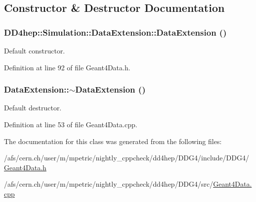 \subsection{Constructor \& Destructor Documentation}
\hypertarget{class_d_d4hep_1_1_simulation_1_1_data_extension_a404504756d040999b53938a61bcb2f53}{
\subsubsection[{DataExtension}]{\setlength{\rightskip}{0pt plus 5cm}DD4hep::Simulation::DataExtension::DataExtension ()}}
\label{class_d_d4hep_1_1_simulation_1_1_data_extension_a404504756d040999b53938a61bcb2f53}


Default constructor. 

Definition at line 92 of file Geant4Data.h.\hypertarget{class_d_d4hep_1_1_simulation_1_1_data_extension_a088b1be47c96c8b6ab44527bfa1f60bc}{
\subsubsection[{$\sim$DataExtension}]{\setlength{\rightskip}{0pt plus 5cm}DataExtension::$\sim$DataExtension ()}}
\label{class_d_d4hep_1_1_simulation_1_1_data_extension_a088b1be47c96c8b6ab44527bfa1f60bc}


Default destructor. 

Definition at line 53 of file Geant4Data.cpp.

The documentation for this class was generated from the following files:\begin{DoxyCompactItemize}
\item 
/afs/cern.ch/user/m/mpetric/nightly\_\-cppcheck/dd4hep/DDG4/include/DDG4/\hyperlink{_geant4_data_8h}{Geant4Data.h}\item 
/afs/cern.ch/user/m/mpetric/nightly\_\-cppcheck/dd4hep/DDG4/src/\hyperlink{_geant4_data_8cpp}{Geant4Data.cpp}\end{DoxyCompactItemize}
